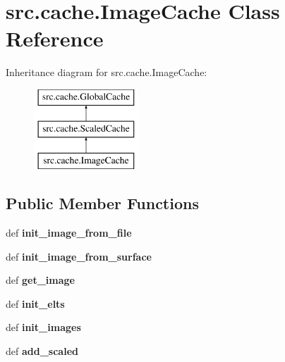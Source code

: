\hypertarget{classsrc_1_1cache_1_1_image_cache}{\section{src.\-cache.\-Image\-Cache \-Class \-Reference}
\label{classsrc_1_1cache_1_1_image_cache}
}
\-Inheritance diagram for src.\-cache.\-Image\-Cache\-:\begin{figure}[H]
\begin{center}
\leavevmode
\includegraphics[height=3.000000cm]{classsrc_1_1cache_1_1_image_cache}
\end{center}
\end{figure}
\subsection*{\-Public \-Member \-Functions}
\begin{DoxyCompactItemize}
\item 
\hypertarget{classsrc_1_1cache_1_1_image_cache_a4c9f29d5205ed27f97b076e19c16c054}{def {\bfseries init\-\_\-image\-\_\-from\-\_\-file}}\label{classsrc_1_1cache_1_1_image_cache_a4c9f29d5205ed27f97b076e19c16c054}

\item 
\hypertarget{classsrc_1_1cache_1_1_image_cache_a366263eba8f84df37fe6e3a7d5ddbf89}{def {\bfseries init\-\_\-image\-\_\-from\-\_\-surface}}\label{classsrc_1_1cache_1_1_image_cache_a366263eba8f84df37fe6e3a7d5ddbf89}

\item 
\hypertarget{classsrc_1_1cache_1_1_image_cache_a3af2b0b8c88860d2cca143441fd90227}{def {\bfseries get\-\_\-image}}\label{classsrc_1_1cache_1_1_image_cache_a3af2b0b8c88860d2cca143441fd90227}

\item 
\hypertarget{classsrc_1_1cache_1_1_image_cache_a751bf8d48a4389c93039436f9aca0452}{def {\bfseries init\-\_\-elts}}\label{classsrc_1_1cache_1_1_image_cache_a751bf8d48a4389c93039436f9aca0452}

\item 
\hypertarget{classsrc_1_1cache_1_1_image_cache_a987c2d16f67eb59dc94ddc2f49dcf613}{def {\bfseries init\-\_\-images}}\label{classsrc_1_1cache_1_1_image_cache_a987c2d16f67eb59dc94ddc2f49dcf613}

\item 
\hypertarget{classsrc_1_1cache_1_1_image_cache_a4c4f0b82c9585d9499a3aa197f9376c1}{def {\bfseries add\-\_\-scaled}}\label{classsrc_1_1cache_1_1_image_cache_a4c4f0b82c9585d9499a3aa197f9376c1}

\end{DoxyCompactItemize}
